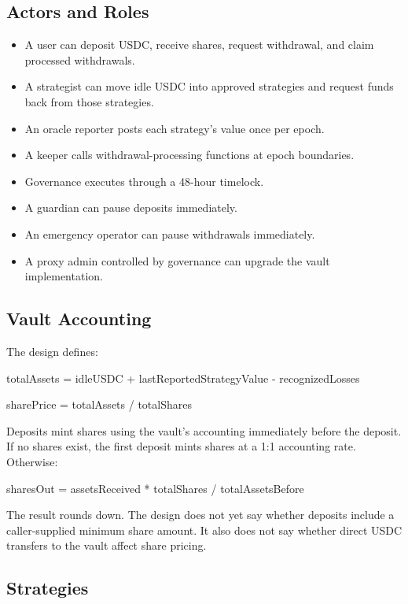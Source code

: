\subsection*{Actors and Roles}

\begin{itemize}
\item A user can deposit USDC, receive shares, request withdrawal, and claim processed withdrawals.
\item A strategist can move idle USDC into approved strategies and request funds back from those strategies.
\item An oracle reporter posts each strategy's value once per epoch.
\item A keeper calls withdrawal-processing functions at epoch boundaries.
\item Governance executes through a 48-hour timelock.
\item A guardian can pause deposits immediately.
\item An emergency operator can pause withdrawals immediately.
\item A proxy admin controlled by governance can upgrade the vault implementation.
\end{itemize}

\subsection*{Vault Accounting}

The design defines:

\begin{codeblock}
totalAssets = idleUSDC + lastReportedStrategyValue - recognizedLosses

sharePrice = totalAssets / totalShares
\end{codeblock}

Deposits mint shares using the vault's accounting immediately before the deposit. If no shares exist, the first deposit mints shares at a 1:1 accounting rate. Otherwise:

\begin{codeblock}
sharesOut = assetsReceived * totalShares / totalAssetsBefore
\end{codeblock}

The result rounds down. The design does not yet say whether deposits include a caller-supplied minimum share amount. It also does not say whether direct USDC transfers to the vault affect share pricing.

\subsection*{Strategies}

